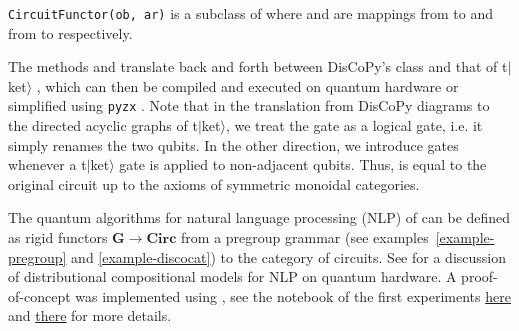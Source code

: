 \begin{class}\normalfont\texttt{CircuitFunctor(ob, ar)}
is a subclass of  where  and  are mappings from  to  and from  to  respectively.
\end{class}

The methods  and  translate back and forth between DisCoPy's  class and that of t$\vert$ket$\rangle$ \cite{SivarajahEtAl20}, which can then be compiled and executed on quantum hardware or simplified using \texttt{pyzx} \cite{KissingervandeWetering19}.
Note that in the translation from DisCoPy diagrams to the directed acyclic graphs of t$\vert$ket$\rangle$, we treat the  gate as a logical gate, i.e. it simply renames the two qubits.
In the other direction, we introduce  gates whenever a t$\vert$ket$\rangle$ gate is applied to non-adjacent qubits.
Thus,  is equal to the original circuit  up to the axioms of symmetric monoidal categories.

\begin{example}
The quantum algorithms for natural language processing (NLP) of \cite{ZengCoecke16} can be defined as rigid functors $\mathbf{G} \to \mathbf{Circ}$ from a pregroup grammar (see examples~\ref{example-pregroup} and \ref{example-discocat}) to the category of circuits.
See \cite{Coecke19} for a discussion of distributional compositional models for NLP on quantum hardware.
A proof-of-concept was implemented using , see the notebook of the first experiments \href{https://github.com/oxford-quantum-group/discopy/blob/master/notebooks/qnlp-experiment.ipynb}{here} and \href{https://medium.com/cambridge-quantum-computing/quantum-natural-language-processing-748d6f27b31d}{there} \cite{Meichanetzidis20} for more details.
\end{example}

